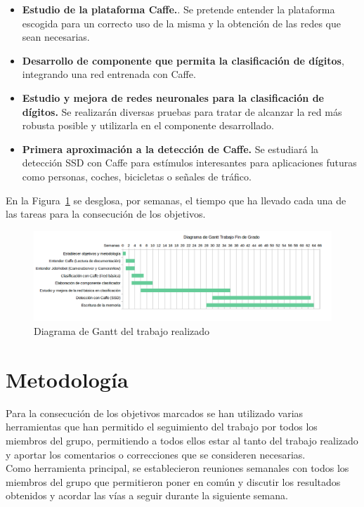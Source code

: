 \begin{itemize}
	\item \textbf{Estudio de la plataforma Caffe.}. Se pretende entender la plataforma escogida para un correcto uso de la misma y la obtención de las redes que sean necesarias.
	\item \textbf{Desarrollo de componente que permita la clasificación de dígitos}, integrando una red entrenada con Caffe.
	\item \textbf{Estudio y mejora de redes neuronales para la clasificación de dígitos.} Se realizarán diversas pruebas para tratar de alcanzar la red más robusta posible y utilizarla en el componente desarrollado.
	\item \textbf{Primera aproximación a la detección de Caffe.} Se estudiará la detección SSD con Caffe para estímulos interesantes para aplicaciones futuras como personas, coches, bicicletas o señales de tráfico.
\end{itemize}

En la Figura~\ref{fig.diagrama} se desglosa, por semanas, el tiempo que ha llevado cada una de las tareas para la consecución de los objetivos.

\begin{figure}[H]
	\begin{center}
		\includegraphics[width=1\textwidth]{figures/diagrama}
		\caption{Diagrama de Gantt del trabajo realizado}
		\label{fig.diagrama}
	\end{center}
\end{figure}

\section{Metodología}
Para la consecución de los objetivos marcados se han utilizado varias herramientas que han permitido el seguimiento del trabajo por todos los miembros del grupo, permitiendo a todos ellos estar al tanto del trabajo realizado y aportar los comentarios o correcciones que se consideren necesarias.\\

Como herramienta principal, se establecieron reuniones semanales con todos los miembros del grupo que permitieron poner en común y discutir los resultados obtenidos y acordar las vías a seguir durante la siguiente semana.\\


